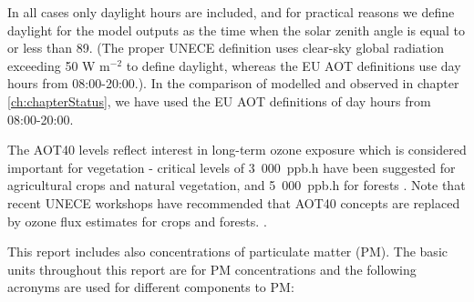 \begin{description}
In all cases only daylight hours are included, and for practical
reasons we define daylight for the model outputs as the time when the
solar zenith angle is equal to or less than 89\degrees. (The proper
UNECE definition uses clear-sky global radiation exceeding 50 W
m$^{-2}$ to define daylight, whereas the EU AOT definitions use day
hours from 08:00-20:00.).
In the comparison of modelled and observed \aotucf in chapter \ref{ch:chapterStatus}, we have used the EU AOT definitions of day
hours from 08:00-20:00.

The AOT40 levels reflect interest in long-term ozone exposure which is
considered important for vegetation - critical levels of 3~000~ppb.h
have been suggested for agricultural crops and natural vegetation, and
5~000~ppb.h for forests \cite[]{MappingManual:Veg}.
Note that recent  UNECE workshops have recommended that AOT40 concepts
are replaced by ozone flux estimates for crops and forests.
\citep[See also][]{R2010:Fluxes}.
\end{description}



This report includes also concentrations of particulate matter
(PM). The basic units \linebreak throughout this report
are \ug for PM
concentrations and the following acronyms are used for different
components to PM:

